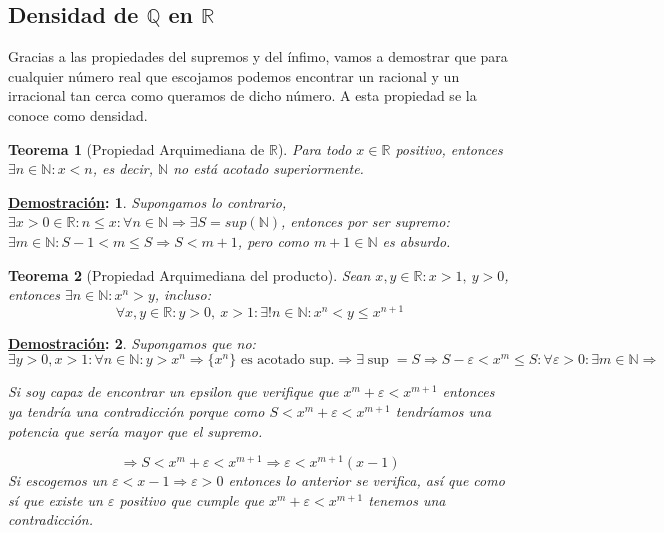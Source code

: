 \documentclass[10pt,a4paper,openright]{book}
\theoremstyle{break}
\newtheorem*{theo}{Teorema}
\newtheorem*{demo}{\underline{Demostración}:}
\begin{document}
\subsection{Densidad de $\mathbb{Q}$ en $\mathbb{R}$}
Gracias a las propiedades del supremos y del ínfimo, vamos a demostrar que para cualquier número real que escojamos podemos encontrar un racional y un irracional tan cerca como queramos de dicho número. A esta propiedad se la conoce como densidad.

\begin{theo}[Propiedad Arquimediana de $\mathbb R$]
Para todo $x\in \mathbb R$ positivo, entonces $\exists n\in \mathbb N: x<n$, es decir, $\mathbb N$ no está acotado superiormente.
\end{theo}
\begin{demo}
Supongamos lo contrario, $\exists x>0\in \mathbb R: n\leq x: \forall n \in \mathbb N\Rightarrow \exists S=sup(\mathbb N)$, entonces por ser supremo: $\exists m \in \mathbb N : S-1<m\leq S\Rightarrow S<m+1$, pero como $m+1\in \mathbb N$ es absurdo.
\end{demo}

\begin{theo}[Propiedad Arquimediana del producto]
Sean $x,y\in \mathbb{R} : x>1, \ y>0$, entonces $\exists n\in \mathbb N: x^n > y$, incluso:
$$\forall x,y \in \mathbb{R} : y>0, \ x>1: \exists! n\in\mathbb N: x^n<y\leq x^{n+1}$$
\end{theo}
\begin{demo}
Supongamos que no:
$$\exists y>0, x>1: \forall n\in \mathbb N: y>x^n\Rightarrow\{x^n\}\mbox{ es acotado sup.}\Rightarrow \exists \sup=S\Rightarrow S-\varepsilon< x^m\leq S: \forall \varepsilon>0:\exists m\in \mathbb N\Rightarrow$$

Si soy capaz de encontrar un epsilon que verifique que $x^m+\varepsilon<x^{m+1}$ entonces ya tendría una contradicción porque como $S<x^m+\varepsilon< x^{m+1}$ tendríamos una potencia que sería mayor que el supremo.

$$\Rightarrow S< x^m +\varepsilon <x^{m+1}\Rightarrow \varepsilon<x^{m+1}(x-1)$$
Si escogemos un $\varepsilon< x-1\Rightarrow \varepsilon>0$ entonces lo anterior se verifica, así que como sí que existe un $\varepsilon$ positivo que cumple que $x^m+\varepsilon< x^{m+1}$ tenemos una contradicción.
\end{demo}
\end{document}
